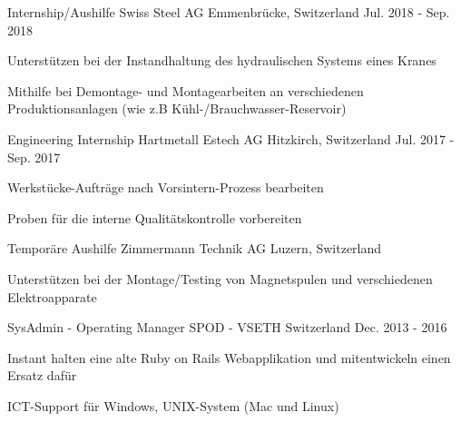 

\begin{cventries}

\cventry
	{Internship/Aushilfe} %
	{Swiss Steel AG} %
	{Emmenbrücke, Switzerland} %
	{Jul. 2018 - Sep. 2018} %
	{
		\begin{cvitems} %
			\item {Unterstützen bei der Instandhaltung des hydraulischen Systems eines Kranes}
			\item {Mithilfe bei Demontage- und Montagearbeiten an verschiedenen Produktionsanlagen (wie z.B Kühl-/Brauchwasser-Reservoir)}
		\end{cvitems}
}	

\cventry
	{Engineering Internship} %
	{Hartmetall Estech AG} %
	{Hitzkirch, Switzerland} %
	{Jul. 2017 - Sep. 2017} %
	{
		\begin{cvitems} %
			\item {Werkstücke-Aufträge nach Vorsintern-Prozess bearbeiten}
			\item {Proben für die interne Qualitätskontrolle vorbereiten}
		\end{cvitems}
}

\cventry
	{Temporäre Aushilfe} %
	{Zimmermann Technik AG} %
	{Luzern, Switzerland} %
	{} %
	{
		\begin{cvitems} %
			\item {Unterstützen bei der Montage/Testing von Magnetspulen und verschiedenen Elektroapparate}
		\end{cvitems}
	}	

  \cventry
    {SysAdmin - Operating Manager} %
    {SPOD - VSETH} %
    {Switzerland} %
    {Dec. 2013 - 2016} %
    {
      \begin{cvitems} %
        \item {Instant halten eine alte Ruby on Rails Webapplikation und mitentwickeln einen Ersatz dafür}
        \item {ICT-Support für Windows, UNIX-System (Mac und Linux)}
      \end{cvitems}
    }


\end{cventries}
